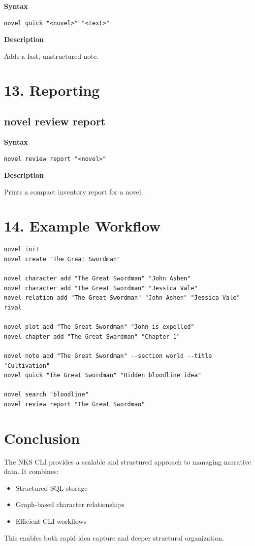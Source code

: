 \documentclass[11pt]{article}
\begin{document}
\textbf{Syntax}
\begin{verbatim}
novel quick "<novel>" "<text>"
\end{verbatim}

\textbf{Description}

Adds a fast, unstructured note.

\section{13. Reporting}

\subsection{novel review report}

\textbf{Syntax}
\begin{verbatim}
novel review report "<novel>"
\end{verbatim}

\textbf{Description}

Prints a compact inventory report for a novel.

\section{14. Example Workflow}

\begin{verbatim}
novel init
novel create "The Great Swordman"

novel character add "The Great Swordman" "John Ashen"
novel character add "The Great Swordman" "Jessica Vale"
novel relation add "The Great Swordman" "John Ashen" "Jessica Vale" rival

novel plot add "The Great Swordman" "John is expelled"
novel chapter add "The Great Swordman" "Chapter 1"

novel note add "The Great Swordman" --section world --title "Cultivation"
novel quick "The Great Swordman" "Hidden bloodline idea"

novel search "bloodline"
novel review report "The Great Swordman"
\end{verbatim}

\section{Conclusion}

The NKS CLI provides a scalable and structured approach to managing narrative data. It combines:

\begin{itemize}
    \item Structured SQL storage
    \item Graph-based character relationships
    \item Efficient CLI workflows
\end{itemize}

This enables both rapid idea capture and deeper structural organization.
\end{document}
